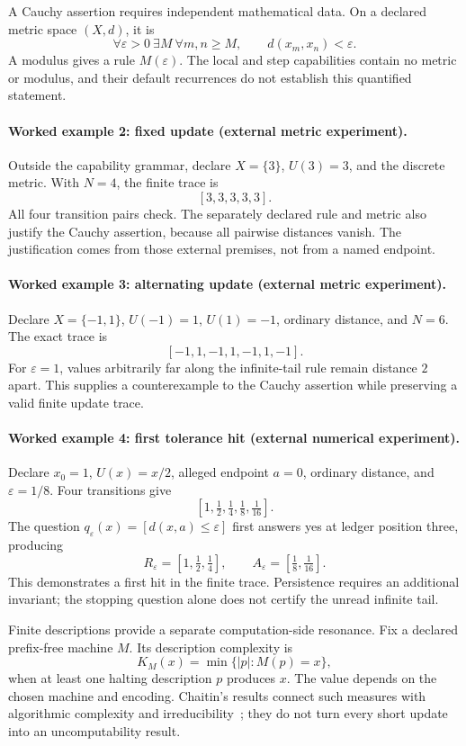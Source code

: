 A Cauchy assertion requires independent mathematical data.  On a declared metric space \((X,d)\), it is
\[
 \forall\varepsilon>0\ \exists M\ \forall m,n\ge M,\qquad d(x_m,x_n)<\varepsilon.
\]
A modulus gives a rule \(M(\varepsilon)\).  The local and step capabilities contain no metric or modulus, and their
default recurrences do not establish this quantified statement.

\paragraph{Worked example 2: fixed update (external metric experiment).}
Outside the capability grammar, declare \(X=\{3\}\), \(U(3)=3\), and the discrete metric.  With \(N=4\), the finite
trace is
\[
                          [3,3,3,3,3].
\]
All four transition pairs check.  The separately declared rule and metric also justify the Cauchy assertion, because
all pairwise distances vanish.  The justification comes from those external premises, not from a named endpoint.

\paragraph{Worked example 3: alternating update (external metric experiment).}
Declare \(X=\{-1,1\}\), \(U(-1)=1\), \(U(1)=-1\), ordinary distance, and \(N=6\).  The exact trace is
\[
                         [-1,1,-1,1,-1,1,-1].
\]
For \(\varepsilon=1\), values arbitrarily far along the infinite-tail rule remain distance \(2\) apart.  This supplies
a counterexample to the Cauchy assertion while preserving a valid finite update trace.

\paragraph{Worked example 4: first tolerance hit (external numerical experiment).}
Declare \(x_0=1\), \(U(x)=x/2\), alleged endpoint \(a=0\), ordinary distance, and
\(\varepsilon=1/8\).  Four transitions give
\[
                    [1,\tfrac12,\tfrac14,\tfrac18,\tfrac1{16}].
\]
The question \(q_\varepsilon(x)=[d(x,a)\le\varepsilon]\) first answers yes at ledger position three, producing
\[
 R_\varepsilon=[1,\tfrac12,\tfrac14],\qquad
 A_\varepsilon=[\tfrac18,\tfrac1{16}].
\]
This demonstrates a first hit in the finite trace.  Persistence requires an additional invariant; the stopping question
alone does not certify the unread infinite tail.

Finite descriptions provide a separate computation-side resonance.  Fix a declared prefix-free machine \(M\).  Its
description complexity is
\[
                 K_M(x)=\min\{|p|:M(p)=x\},
\]
when at least one halting description \(p\) produces \(x\).  The value depends on the chosen machine and encoding.
Chaitin's results connect such measures with algorithmic complexity and irreducibility~\cite{chaitin1974}; they do not
turn every short update into an uncomputability result.

